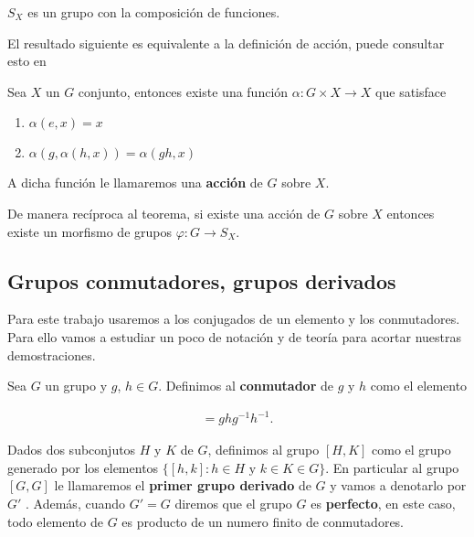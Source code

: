 	\begin{nt}
	$S_X$ es un grupo con la composición de funciones. 
	\end{nt}	
	El resultado siguiente es equivalente a la definición de acción, puede consultar esto en 
	\begin{te}
	Sea $X$ un $G$ conjunto, entonces existe una función $\alpha:G \times X \to X$ que satisface
	\begin{enumerate}
	\item $\alpha(e,x)=x$
	\item $\alpha(g,\alpha(h,x))=\alpha(gh,x)$
	\end{enumerate}
	A dicha función le llamaremos una \textbf{acción} de $G$ sobre $X$.
	\end{te}
	
	\begin{nt}
	De manera recíproca al teorema, si existe una acción de $G$ sobre $X$ entonces existe un morfismo de grupos $\varphi:G \to S_X$.  
	\end{nt}
	
\subsection*{Grupos conmutadores, grupos derivados}
Para este trabajo usaremos a los conjugados de un elemento y los conmutadores. Para ello vamos a estudiar un poco de notación y de teoría para acortar nuestras demostraciones. 

\begin{df}
Sea $G$ un grupo y $g$, $h \in G$. Definimos al \textbf{conmutador} de $g$ y $h$ como el elemento 

\begin{align*}
[g,h]=ghg^{-1}h^{-1}.
\end{align*}

Dados dos subconjutos $H$ y $K$ de $G$, definimos al grupo $[H,K]$ como el grupo generado por los elementos $\{[h,k]:h \in H \text{ y }k \in K \in G \}$. En particular al grupo $[G,G]$ le llamaremos el \textbf{primer grupo derivado} de $G$ y vamos a denotarlo por $G'$ . Además, cuando $ G' = G $ diremos que el grupo $G$ es \textbf{perfecto}, en este caso, todo elemento de $G$ es producto de un numero finito de conmutadores. 
\end{df}
	
